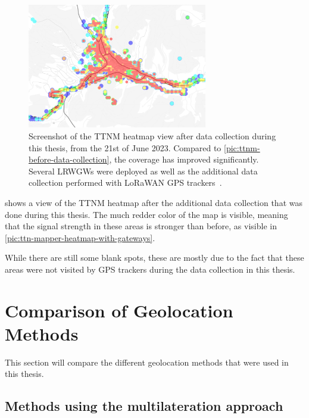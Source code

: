 \begin{figure}[htbp]
    \centering
    \includegraphics[width=0.7\textwidth]{pictures/ttn-mapper/ttnm_heatmap_after_data_collection.jpg}
    \caption{
        Screenshot of the \ac{TTNM} heatmap view after data collection during this thesis, from the 21st of June 2023.
        Compared to \cref{pic:ttnm-before-data-collection}, the coverage has improved significantly.
        Several \aclp{LRWGW} were deployed as well as the additional data collection performed with \ac{LoRaWAN} \ac{GPS} trackers~\cite{ttn_mapper_ttn_2023}.
    }\label{pic:ttnm-heatmap-after-data-collection}
\end{figure}

 shows a view of the \ac{TTNM} heatmap after the additional data collection that was done during this thesis.
The much redder color of the map is visible, meaning that the signal strength in these areas is stronger than before, as visible in \cref{pic:ttn-mapper-heatmap-with-gateways}.

While there are still some blank spots, these are mostly due to the fact that these areas were not visited by \ac{GPS} trackers during the data collection in this thesis.

\section{Comparison of Geolocation Methods}

This section will compare the different geolocation methods that were used in this thesis.

\subsection{Methods using the multilateration approach}\label{subsec:conclusion-multilateration}

